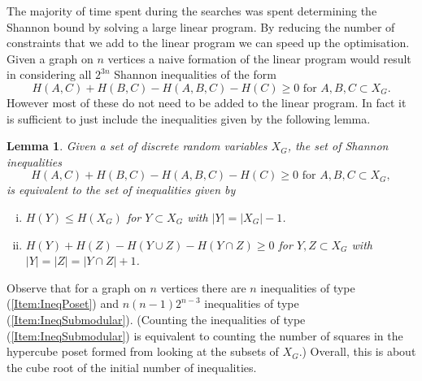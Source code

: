 \documentclass[a4paper, 14pt]{extarticle}
\theoremstyle{plain}
\newtheorem{lemma}[proposition]{Lemma}
\begin{document}
The majority of time spent during the searches was spent determining
the Shannon bound by solving a large linear program. By reducing the
number of constraints that we add to the linear program we can speed up
the optimisation. Given a graph on $n$ vertices a naive formation of
the linear program would result in considering all $2^{3n}$ Shannon
inequalities of the form
\[
\mbox{$H(A,C)+H(B,C)-H(A,B,C)-H(C)\geq 0$ for $A,B,C\subset X_G$}.
\]
However most of these do not need to be added to the linear program. In fact
it is sufficient to just include the inequalities given
by the following lemma.

\begin{lemma}\label{Lem:FewerInequalities}
Given a set of discrete random variables $X_G$, the set of Shannon
inequalities
\[
\mbox{$H(A,C)+H(B,C)-H(A,B,C)-H(C)\geq 0$ for $A,B,C\subset X_G$},
\]
is equivalent to the set of inequalities given by
\begin{enumerate}[(i)]
\item\label{Item:IneqPoset} $H(Y)\leq H(X_G)$ for $Y\subset X_G$ with $|Y|=|X_G|-1$.
\item\label{Item:IneqSubmodular} $H(Y)+H(Z)-H(Y\cup Z)-H(Y\cap Z)\geq 0$ for $Y,Z\subset X_G$ with $|Y|=|Z|=|Y\cap Z|+1$.
\end{enumerate}
\end{lemma}
Observe that for a graph on $n$ vertices there are $n$ inequalities of type (\ref{Item:IneqPoset}) and $n(n-1)2^{n-3}$ inequalities of type (\ref{Item:IneqSubmodular}). (Counting the inequalities of type (\ref{Item:IneqSubmodular}) is equivalent to counting the number of squares in the hypercube poset formed from looking at the subsets of $X_G$.)
Overall, this is about the cube root of the initial number of inequalities.
\end{document}
